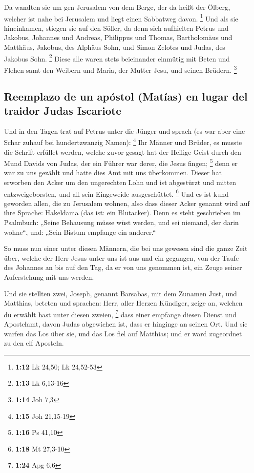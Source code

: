  Da wandten sie um gen Jerusalem von dem Berge, der da
heißt der Ölberg, welcher ist nahe bei Jerusalem und liegt einen
Sabbatweg davon. \footnote{\textbf{1:12} Lk 24,50; Lk 24,52-53}
 Und als sie hineinkamen, stiegen sie auf den Söller, da
denn sich aufhielten Petrus und Jakobus, Johannes und Andreas, Philippus
und Thomas, Bartholomäus und Matthäus, Jakobus, des Alphäus Sohn, und
Simon Zelotes und Judas, des Jakobus Sohn. \footnote{\textbf{1:13} Lk
  6,13-16}  Diese alle waren stets beieinander einmütig
mit Beten und Flehen samt den Weibern und Maria, der Mutter Jesu, und
seinen Brüdern. \footnote{\textbf{1:14} Joh 7,3}

\hypertarget{reemplazo-de-un-apuxf3stol-matuxedas-en-lugar-del-traidor-judas-iscariote}{%
\subsection{Reemplazo de un apóstol (Matías) en lugar del traidor Judas
Iscariote}\label{reemplazo-de-un-apuxf3stol-matuxedas-en-lugar-del-traidor-judas-iscariote}}

 Und in den Tagen trat auf Petrus unter die Jünger und
sprach (es war aber eine Schar zuhauf bei hundertzwanzig Namen):
\footnote{\textbf{1:15} Joh 21,15-19}  Ihr Männer und
Brüder, es musste die Schrift erfüllet werden, welche zuvor gesagt hat
der Heilige Geist durch den Mund Davids von Judas, der ein Führer war
derer, die Jesus fingen; \footnote{\textbf{1:16} Ps 41,10}
 denn er war zu uns gezählt und hatte dies Amt mit uns
überkommen.  Dieser hat erworben den Acker um den
ungerechten Lohn und ist abgestürzt und mitten entzweigeborsten, und all
sein Eingeweide ausgeschüttet. \footnote{\textbf{1:18} Mt 27,3-10}
 Und es ist kund geworden allen, die zu Jerusalem wohnen,
also dass dieser Acker genannt wird auf ihre Sprache: Hakeldama (das
ist: ein Blutacker).  Denn es steht geschrieben im
Psalmbuch: „Seine Behausung müsse wüst werden, und sei niemand, der
darin wohne``, und: „Sein Bistum empfange ein anderer.``

 So muss nun einer unter diesen Männern, die bei uns
gewesen sind die ganze Zeit über, welche der Herr Jesus unter uns ist
aus und ein gegangen,  von der Taufe des Johannes an bis
auf den Tag, da er von uns genommen ist, ein Zeuge seiner Auferstehung
mit uns werden.

 Und sie stellten zwei, Joseph, genannt Barsabas, mit dem
Zunamen Just, und Matthias,  beteten und sprachen: Herr,
aller Herzen Kündiger, zeige an, welchen du erwählt hast unter diesen
zweien, \footnote{\textbf{1:24} Apg 6,6}  dass einer
empfange diesen Dienst und Apostelamt, davon Judas abgewichen ist, dass
er hinginge an seinen Ort.  Und sie warfen das Los über
sie, und das Los fiel auf Matthias; und er ward zugeordnet zu den elf
Aposteln.

